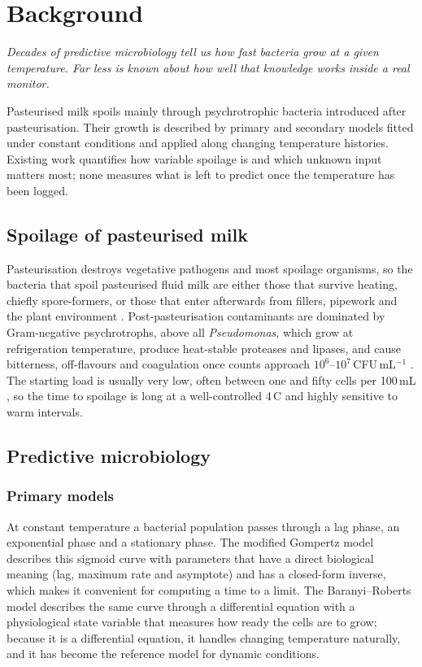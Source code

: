 \documentclass[11pt,a4paper,twoside,openany]{book}
\newcommand{\hook}[1]{{\noindent\fontsize{14}{20}\selectfont\itshape\color{dggrey}#1\par}\vspace{14pt}}
\newcommand{\degC}{\,\textdegree C}
\theoremstyle{plain}\newtheorem{proposition}{Proposition}\newtheorem{corollary}{Corollary}
\theoremstyle{definition}\newtheorem{definition}{Definition}[chapter]
\begin{document}
\chapter{Background}\label{ch:background}
\hook{Decades of predictive microbiology tell us how fast bacteria grow at a given temperature. Far less is known about how well that knowledge works inside a real monitor.}
\begin{summary}
Pasteurised milk spoils mainly through psychrotrophic bacteria introduced after pasteurisation. Their growth is described by primary and secondary models fitted under constant conditions and applied along changing temperature histories. Existing work quantifies how variable spoilage is and which unknown input matters most; none measures what is left to predict once the temperature has been logged.
\end{summary}
\section{Spoilage of pasteurised milk}
Pasteurisation destroys vegetative pathogens and most spoilage organisms, so the bacteria that spoil pasteurised fluid milk are either those that survive heating, chiefly spore-formers, or those that enter afterwards from fillers, pipework and the plant environment \cite{martin2021,ranieri2009}. Post-pasteurisation contaminants are dominated by Gram-negative psychrotrophs, above all \textit{Pseudomonas}, which grow at refrigeration temperature, produce heat-stable proteases and lipases, and cause bitterness, off-flavours and coagulation once counts approach $10^6$--$10^7$\,CFU\,mL$^{-1}$ \cite{martin2021}. The starting load is usually very low, often between one and fifty cells per 100\,mL \cite{martin2021}, so the time to spoilage is long at a well-controlled 4\degC{} and highly sensitive to warm intervals.

\section{Predictive microbiology}
\subsection{Primary models}
At constant temperature a bacterial population passes through a lag phase, an exponential phase and a stationary phase. The modified Gompertz model \cite{gompertz1825,zwietering1990} describes this sigmoid curve with parameters that have a direct biological meaning (lag, maximum rate and asymptote) and has a closed-form inverse, which makes it convenient for computing a time to a limit. The Baranyi--Roberts model \cite{baranyi1993,baranyi1994} describes the same curve through a differential equation with a physiological state variable that measures how ready the cells are to grow; because it is a differential equation, it handles changing temperature naturally, and it has become the reference model for dynamic conditions.
\end{document}
